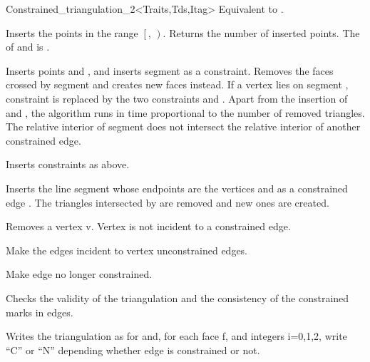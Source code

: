 \begin{ccRefClass}{Constrained_triangulation_2<Traits,Tds,Itag>}
{Equivalent to .}

{Inserts the points in the range
 $\left[\right.$, $\left.\right)$.
 Returns the number of inserted points.
 \ccPrecond The  of  and 
 is .}

{ Inserts points  and , and inserts segment  as a
constraint. Removes the faces crossed by segment  and creates new
faces instead. If a vertex  lies on segment , constraint  is
replaced by the two constraints  and . Apart from the insertion of
 and , the algorithm runs in time proportional to the number of
removed triangles. 
\ccPrecond The relative interior of segment  does not
intersect the relative interior of another constrained edge.}

{Inserts constraints  as above.}

{ Inserts the line segment  whose endpoints are the vertices 
 and
  as a constrained edge . The triangles intersected by 
are removed and new ones are created.}


{ Removes a vertex v. 
\ccPrecond Vertex   is not incident to a constrained edge.}

{Make the edges incident to vertex  unconstrained edges.}

{ Make edge   no longer constrained.}

\begin{ccAdvanced}
{Checks the validity of the triangulation and
the consistency of the constrained marks in edges.}

\end{ccAdvanced}



{Writes the triangulation as for  and, for each face f, and integers i=0,1,2,
write ``C'' or ``N'' depending whether edge 
 is constrained or not.}


\end{ccRefClass}
